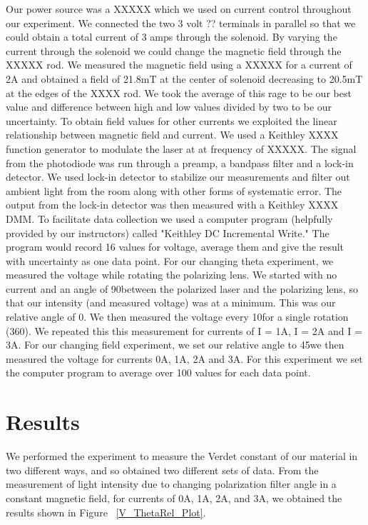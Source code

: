 \documentclass[prb,preprint]{revtex4-1}
\begin{document}
Our power source was a XXXXX which we used on current control throughout our experiment. We connected the two 3 volt ??  terminals in parallel so that we could obtain a total current of 3 amps through the solenoid. By varying the current through the solenoid we could change the magnetic field through the XXXXX rod. We measured the magnetic field using a XXXXX for a current of 2A and obtained a field of 21.8mT at the center of solenoid decreasing to 20.5mT at the edges of the XXXX rod. We took the average of this rage to be our best value and difference between high and low values divided by two to be our uncertainty. To obtain field values for other currents we exploited the linear relationship between magnetic field and current.
We used a Keithley XXXX function generator to modulate the laser at at frequency of XXXXX. The signal from the photodiode was run through a preamp, a bandpass filter and a lock-in detector. We used lock-in detector to stabilize our measurements and filter out ambient light from the room along with other forms of systematic error.
The output from the lock-in detector was then measured with a Keithley XXXX DMM. To facilitate data collection we used a computer program (helpfully provided by our instructors) called "Keithley DC Incremental Write." The program would record 16 values for voltage, average them and give the result with uncertainty as one data point. 
For our changing theta experiment, we measured the voltage while rotating the polarizing lens. We started with no current and an angle of 90\deg between the polarized laser and the polarizing lens, so that our intensity (and measured voltage) was at a minimum. This was our relative angle of 0\deg. We then measured the voltage every 10\deg for a single rotation (360\deg). We repeated this this measurement for currents of I = 1A, I = 2A and I = 3A.
For our changing field experiment, we set our relative angle to 45\deg we then measured the voltage for currents 0A, \pm1A, \pm2A and \pm3A. For this experiment we set the computer program to average over 100 values for each data point.

\section{Results}

We performed the experiment to measure the Verdet constant of our material in two different ways, and so obtained two different sets of data.  From the measurement of light intensity due to changing polarization filter angle in a constant magnetic field, for currents of 0A, 1A, 2A, and 3A, we obtained the results shown in Figure ~\ref{V_ThetaRel_Plot}. 
\end{document}
